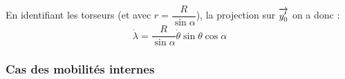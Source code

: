 \documentclass[10pt]{article}
\begin{document}
\begin{exemple}
En identifiant les torseurs (et avec $r= \dfrac{R}{\sin\alpha} $), la projection sur $\overrightarrow{y'_0}$ on a donc : 
$$
\dot{\lambda} = \dfrac{R}{\sin\alpha}\dot{\theta} \sin\theta \cos\alpha
$$






\end{exemple}
\subsubsection{Cas des mobilités internes}
\end{document}

